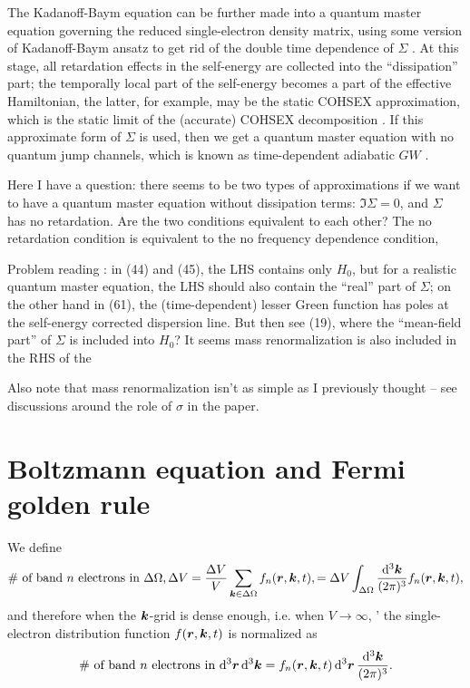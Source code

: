 \documentclass[hyperref, a4paper]{article}
\begin{document}
The Kadanoff-Baym equation can be further made into a quantum master equation 
governing the reduced single-electron density matrix, 
using some version of Kadanoff-Baym ansatz 
to get rid of the double time dependence of $\Sigma$
\cite{lipavsky1986generalized,PhysRevB.92.205304,vspivcka2005long,hermanns2013few}.
At this stage, all retardation effects in the self-energy 
are collected into the ``dissipation'' part;
the temporally local part of the self-energy 
becomes a part of the effective Hamiltonian,
the latter, for example, may be the static COHSEX approximation,
which is the static limit of the (accurate) COHSEX decomposition
\cite{faber2014electronic}.
If this approximate form of $\Sigma$ is used,
then we get a quantum master equation 
with no quantum jump channels,
which is known as time-dependent adiabatic $GW$ \cite{attaccalite2011real,chan2021giant}.

Here I have a question: 
there seems to be two types of approximations 
if we want to have a quantum master equation without dissipation terms:
$\Im \Sigma = 0$, 
and $\Sigma$ has no retardation.
Are the two conditions equivalent to each other?
The no retardation condition is equivalent to the no frequency dependence condition,

Problem reading \cite{vspivcka2005long}:
in (44) and (45), 
the LHS contains only $H_0$,
but for a realistic quantum master equation,
the LHS should also contain the ``real'' part of $\Sigma$;
on the other hand in (61),
the (time-dependent) lesser Green function 
has poles at the self-energy corrected dispersion line.
But then see (19), where the ``mean-field part'' of $\Sigma$
is included into $H_0$?
It seems mass renormalization is also included in the RHS of the 

Also note that mass renormalization isn't as simple as I previously thought
-- see discussions around the role of $\sigma$ in the paper.

\section{Boltzmann equation and Fermi golden rule}

We define
\[
    \text{\# of band $n$ electrons in $\Delta \Omega, \Delta V$}
    = \frac{\Delta V}{V} \sum_{\vb*{k} \in \Delta \Omega} f_{n} (\vb*{r}, \vb*{k}, t),
    = \Delta V \int_{\Delta \Omega} \frac{\dd[3]{\vb*{k}}}{(2\pi)^3} f_n (\vb*{r}, \vb*{k}, t),
\]
and therefore when the $\vb*{k}$-grid is dense enough, i.e. when $V \to \infty$, '
the single-electron distribution function $f(\vb*{r}, \vb*{k}, t)$ is 
normalized as
\begin{equation}
    \text{\# of band $n$ electrons in $\dd[3]{\vb*{r}} \dd[3]{\vb*{k}}$} 
    = f_n(\vb*{r}, \vb*{k}, t) \dd[3]{\vb*{r}} \frac{\dd[3]{\vb*{k}}}{(2\pi)^3}.
\end{equation}
\end{document}
